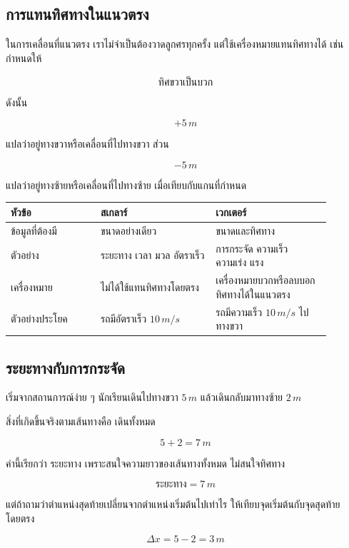 \documentclass[12pt,a4paper]{report}
\begin{document}
\subsection{การแทนทิศทางในแนวตรง}

ในการเคลื่อนที่แนวตรง เราไม่จำเป็นต้องวาดลูกศรทุกครั้ง แต่ใช้เครื่องหมายแทนทิศทางได้ เช่น กำหนดให้

\[
\text{ทิศขวาเป็นบวก}
\]

ดังนั้น

\[
+5\,\si{m}
\]

แปลว่าอยู่ทางขวาหรือเคลื่อนที่ไปทางขวา ส่วน

\[
-5\,\si{m}
\]

แปลว่าอยู่ทางซ้ายหรือเคลื่อนที่ไปทางซ้าย เมื่อเทียบกับแกนที่กำหนด

\begin{center}
\begin{tabular}{|p{0.25\linewidth}|p{0.32\linewidth}|p{0.32\linewidth}|}
\hline
\textbf{หัวข้อ} & \textbf{สเกลาร์} & \textbf{เวกเตอร์} \\[0pt]
\hline
ข้อมูลที่ต้องมี & ขนาดอย่างเดียว & ขนาดและทิศทาง \\
\hline
ตัวอย่าง & ระยะทาง เวลา มวล อัตราเร็ว & การกระจัด ความเร็ว ความเร่ง แรง \\
\hline
เครื่องหมาย & ไม่ได้ใช้แทนทิศทางโดยตรง & เครื่องหมายบวกหรือลบบอกทิศทางได้ในแนวตรง \\
\hline
ตัวอย่างประโยค & รถมีอัตราเร็ว $10\,\si{m/s}$ & รถมีความเร็ว $10\,\si{m/s}$ ไปทางขวา \\
\hline
\end{tabular}
\end{center}

\subsection{ระยะทางกับการกระจัด}

เริ่มจากสถานการณ์ง่าย ๆ นักเรียนเดินไปทางขวา $5\,\si{m}$ แล้วเดินกลับมาทางซ้าย $2\,\si{m}$

สิ่งที่เกิดขึ้นจริงตามเส้นทางคือ เดินทั้งหมด

\[
5+2=7\,\si{m}
\]

ค่านี้เรียกว่า ระยะทาง เพราะสนใจความยาวของเส้นทางทั้งหมด ไม่สนใจทิศทาง

\[
\text{ระยะทาง} = 7\,\si{m}
\]

แต่ถ้าถามว่าตำแหน่งสุดท้ายเปลี่ยนจากตำแหน่งเริ่มต้นไปเท่าไร ให้เทียบจุดเริ่มต้นกับจุดสุดท้ายโดยตรง

\[
\Delta x = 5-2 = 3\,\si{m}
\]
\end{document}
